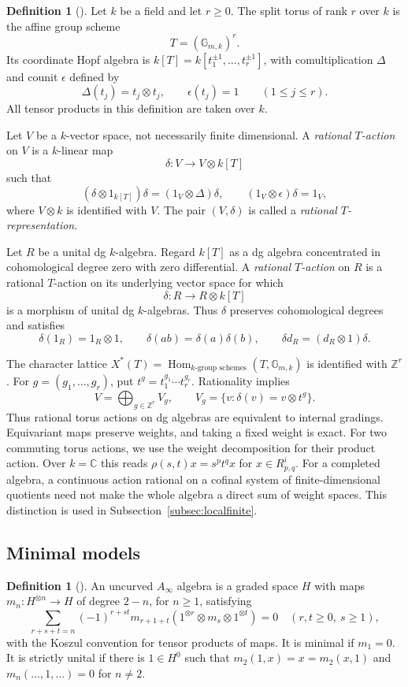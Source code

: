 \documentclass[12pt,a4paper,english,reqno]{amsart}
\theoremstyle{plain}
\theoremstyle{definition}
\newtheorem{dfn*}[thm]{Definition}
\numberwithin{equation}{section}
\def\de{\delta}
\def\ro{\rho}
\def\De{\Delta}
\def\Hom{\operatorname{Hom}}
\def\bbZ{{\mathbb Z}}
\def\bbC{{\mathbb C}}
\def\ox{\otimes}
\def\Ds{\bigoplus}
\def\Ainf{A_\infty}
\begin{document}
\begin{dfn*}[{\cite[Expos\'e I, Section 4]{SGA}}]
\label{def:torus-action}
Let $k$ be a field and let $r\geq 0$. The split torus of rank $r$
over $k$ is the affine group scheme
\[
 T=(\mathbb G_{m,k})^r.
\]
Its coordinate Hopf algebra is
$k[T]=k[t_1^{\pm1},\ldots,t_r^{\pm1}]$,
with comultiplication $\De$ and counit $\epsilon$ defined by
\[
 \De(t_j)=t_j\ox t_j,
 \qquad
 \epsilon(t_j)=1
 \qquad (1\leq j\leq r).
\]
All tensor products in this definition are taken over $k$.

Let $V$ be a $k$-vector space, not necessarily finite dimensional.
A \emph{rational $T$-action} on $V$ is a $k$-linear map
\[
 \de:V\longrightarrow V\ox k[T]
\]
such that
\[
 (\de\ox 1_{k[T]})\de=(1_V\ox\De)\de,
 \qquad
 (1_V\ox\epsilon)\de=1_V,
\]
where $V\ox k$ is identified with $V$.
The pair $(V,\de)$ is called a \emph{rational $T$-representation}.

Let $R$ be a unital dg $k$-algebra. Regard $k[T]$ as a dg algebra
concentrated in cohomological degree zero with zero differential.
A \emph{rational $T$-action} on $R$ is a rational $T$-action on
its underlying vector space for which
\[
 \de:R\longrightarrow R\ox k[T]
\]
is a morphism of unital dg $k$-algebras. Thus $\de$ preserves
cohomological degrees and satisfies
\[
 \de(1_R)=1_R\ox1,\qquad
 \de(ab)=\de(a)\de(b),\qquad
 \de d_R=(d_R\ox1)\de.
\]
\end{dfn*}

The character lattice $X^*(T)=\Hom_{k\text{-group schemes}}(T,\mathbb G_{m,k})$
is identified with $\bbZ^r$. For $g=(g_1,\ldots,g_r)$, put
$t^g=t_1^{g_1}\cdots t_r^{g_r}$. Rationality implies
\[
 V=\Ds_{g\in\bbZ^r}V_g,\qquad
 V_g=\{v:\de(v)=v\ox t^g\}.
\]
Thus rational torus actions on dg algebras are equivalent to internal
gradings. Equivariant maps preserve weights, and taking a fixed weight
is exact. For two commuting torus actions, we use the weight decomposition
for their product action. Over $k=\bbC$ this reads
$\ro(s,t)x=s^pt^qx$ for $x\in R^i_{p,q}$.
For a completed algebra, a continuous action rational on a cofinal
system of finite-dimensional quotients need not make the whole algebra
a direct sum of weight spaces. This distinction is used in
Subsection~\ref{subsec:localfinite}.

\subsection{Minimal models}\label{subsec:dg-properties}

\begin{dfn*}[{\cite[Sections 3.1 and 3.4--3.5]{KellerAinf}}]\label{def:ainfinity}
An uncurved $\Ainf$ algebra is a graded space $H$ with maps
$m_n:H^{\ox n}\to H$ of degree $2-n$, for $n\ge1$, satisfying
\[
 \sum_{r+s+t=n}(-1)^{r+st}
 m_{r+1+t}(1^{\ox r}\ox m_s\ox1^{\ox t})=0
 \quad(r,t\ge0,\ s\ge1),
\]
with the Koszul convention for tensor products of maps.
It is minimal if $m_1=0$. It is strictly unital if there is
$1\in H^0$ such that $m_2(1,x)=x=m_2(x,1)$ and
$m_n(\ldots,1,\ldots)=0$ for $n\ne2$.
\end{dfn*}
\end{document}
